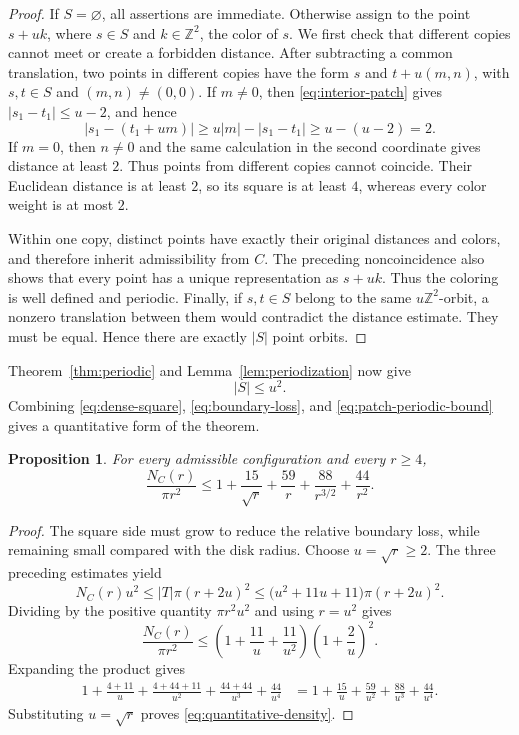 \documentclass[11pt,a4paper]{article}
\newtheorem{proposition}[theorem]{Proposition}
\theoremstyle{definition}
\theoremstyle{remark}
\newcommand{\Z}{\mathbb{Z}}
\begin{document}
\begin{proof}
If $S=\varnothing$, all assertions are immediate. Otherwise assign to
the point $s+uk$, where $s\in S$ and $k\in\Z^2$, the color of $s$.
We first check that different copies cannot meet or create a forbidden
distance. After subtracting a common translation, two points in
different copies have the form $s$ and $t+u(m,n)$, with $s,t\in S$
and $(m,n)\ne(0,0)$. If $m\ne0$, then
\eqref{eq:interior-patch} gives $|s_1-t_1|\leq u-2$, and hence
\[
|s_1-(t_1+um)|
\geq u|m|-|s_1-t_1|
\geq u-(u-2)=2.
\]
If $m=0$, then $n\ne0$ and the same calculation in the second
coordinate gives distance at least $2$. Thus points from different
copies cannot coincide. Their Euclidean distance is at least $2$, so
its square is at least $4$, whereas every color weight is at most $2$.

Within one copy, distinct points have exactly their original distances
and colors, and therefore inherit admissibility from $C$. The preceding
noncoincidence also shows that every point has a unique representation
as $s+uk$. Thus the coloring is well defined and periodic. Finally,
if $s,t\in S$ belong to the same $u\Z^2$-orbit, a nonzero translation
between them would contradict the distance estimate. They must be
equal. Hence there are exactly $|S|$ point orbits.
\end{proof}

Theorem~\ref{thm:periodic} and Lemma~\ref{lem:periodization} now give
\begin{equation}
\label{eq:patch-periodic-bound}
|S|\leq u^2.
\end{equation}
Combining \eqref{eq:dense-square}, \eqref{eq:boundary-loss}, and
\eqref{eq:patch-periodic-bound} gives a quantitative form of the theorem.

\begin{proposition}
\label{prop:quantitative}
For every admissible configuration and every $r\geq4$,
\begin{equation}
\label{eq:quantitative-density}
\frac{N_C(r)}{\pi r^2}
\leq1+\frac{15}{\sqrt r}+\frac{59}{r}
       +\frac{88}{r^{3/2}}+\frac{44}{r^2}.
\end{equation}
\end{proposition}

\begin{proof}
The square side must grow to reduce the relative boundary loss, while
remaining small compared with the disk radius. Choose $u=\sqrt r\geq2$.
The three preceding estimates yield
\[
N_C(r)u^2
\leq |T|\pi(r+2u)^2
\leq\bigl(u^2+11u+11\bigr)\pi(r+2u)^2.
\]
Dividing by the positive quantity $\pi r^2u^2$ and using $r=u^2$
gives
\[
\frac{N_C(r)}{\pi r^2}
\leq\left(1+\frac{11}{u}+\frac{11}{u^2}\right)
     \left(1+\frac{2}{u}\right)^2.
\]
Expanding the product gives
\begin{align*}
1+\frac{4+11}{u}
 +\frac{4+44+11}{u^2}
 +\frac{44+44}{u^3}
 +\frac{44}{u^4}
&=1+\frac{15}{u}+\frac{59}{u^2}
    +\frac{88}{u^3}+\frac{44}{u^4}.
\end{align*}
Substituting $u=\sqrt r$ proves \eqref{eq:quantitative-density}.
\end{proof}
\end{document}

